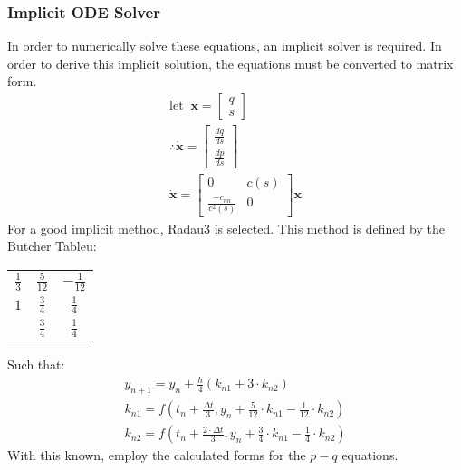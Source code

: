 \documentclass{article}
\begin{document}
\subsubsection{Implicit ODE Solver}
In order to numerically solve these equations, an implicit solver is required. In order to derive this implicit solution, the equations must be converted to matrix form.
\begin{align*}
  \textrm{let}\;\;\bm{x}=\begin{bmatrix}q \\ s \end{bmatrix}\\
  \therefore \dot{\bm{x}}=\begin{bmatrix} \frac{dq}{ds} \\ \frac{dp}{ds}\end{bmatrix}\\
  \dot{\bm{x}} = \begin{bmatrix} 0 & c(s) \\ \frac{-c_{nn}}{c^2(s)} & 0\end{bmatrix}\bm{x}
\end{align*}
For a good implicit method, Radau3 is selected. This method is defined by the Butcher Tableu:
\begin{center}
  \begin{tabular}{c|c c}
    $\frac{1}{3}$ & $\frac{5}{12}$ & $-\frac{1}{12}$ \\
    $1$ & $\frac{3}{4}$ & $\frac{1}{4}$ \\
    \hline
                & $\frac{3}{4}$ & $\frac{1}{4}$
  \end{tabular}
\end{center}
Such that:
\begin{align*}
  y_{n+1} = y_n + \frac{h}{4}\left(k_{n1} + 3\cdot k_{n2} \right)\\
  k_{n1}=f(t_n + \frac{\Delta t}{3}, y_n + \frac{5}{12}\cdot k_{n1} -\frac{1}{12}\cdot k_{n2})\\
  k_{n2}=f(t_n + \frac{2\cdot\Delta t}{3}, y_n + \frac{3}{4}\cdot k_{n1} -\frac{1}{4}\cdot k_{n2})
\end{align*}
With this known, employ the calculated forms for the $p-q$ equations.
\end{document}
